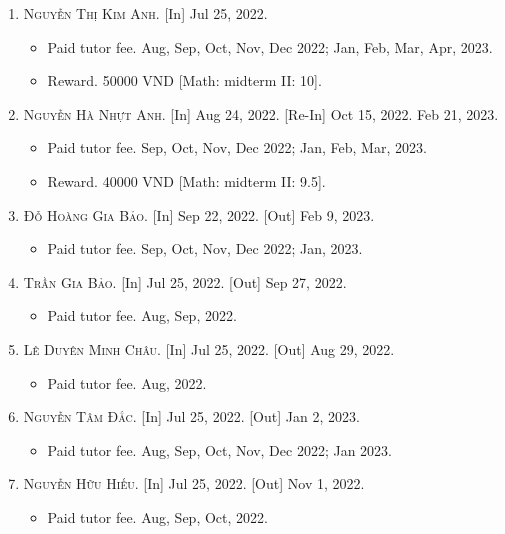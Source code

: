 \documentclass{article}
\begin{document}
\begin{enumerate}
	\item \textsc{Nguyễn Thị Kim Anh.} \textsf{[In]} Jul 25, 2022.
	\begin{itemize}
		\item \textsf{Paid tutor fee.} Aug, Sep, Oct, Nov, Dec 2022; Jan, Feb, Mar, Apr, 2023.
		\item \textsf{Reward.} 50000 VND [Math: midterm II: 10].
	\end{itemize}
	\item \textsc{Nguyễn Hà Nhựt Anh.} \textsf{[In]} Aug 24, 2022. \textsf{[Re-In]} Oct 15, 2022. Feb 21, 2023.
	\begin{itemize}
		\item \textsf{Paid tutor fee.} Sep, Oct, Nov, Dec 2022; Jan, Feb, Mar, 2023.
		\item \textsf{Reward.} 40000 VND [Math: midterm II: 9.5].
	\end{itemize}
	\item \textsc{Đỗ Hoàng Gia Bảo.} \textsf{[In]} Sep 22, 2022. \textsf{[Out]} Feb 9, 2023.
	\begin{itemize}
		\item \textsf{Paid tutor fee.} Sep, Oct, Nov, Dec 2022; Jan, 2023.
	\end{itemize}
	\item \textsc{Trần Gia Bảo.} \textsf{[In]} Jul 25, 2022. \textsf{[Out]} Sep 27, 2022.
	\begin{itemize}
		\item \textsf{Paid tutor fee.} Aug, Sep, 2022.
	\end{itemize}
	\item \textsc{Lê Duyên Minh Châu.} \textsf{[In]} Jul 25, 2022. \textsf{[Out]} Aug 29, 2022.
	\begin{itemize}
		\item \textsf{Paid tutor fee.} Aug, 2022.
	\end{itemize}
	\item \textsc{Nguyễn Tâm Đắc.} \textsf{[In]} Jul 25, 2022. \textsf{[Out]} Jan 2, 2023.
	\begin{itemize}
		\item \textsf{Paid tutor fee.} Aug, Sep, Oct, Nov, Dec 2022; Jan 2023.
	\end{itemize}
	\item \textsc{Nguyễn Hữu Hiếu.} \textsf{[In]} Jul 25, 2022. \textsf{[Out]} Nov 1, 2022.
	\begin{itemize}
		\item \textsf{Paid tutor fee.} Aug, Sep, Oct, 2022.

\end{itemize}
\end{enumerate}
\end{document}
